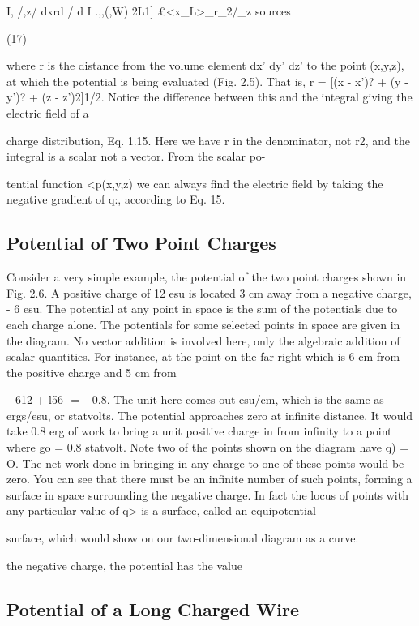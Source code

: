 I, /,z/ dxrd / d I
.,,(,W) 2L1] £<x_L>_r_2/_z
sources

(17)

where r is the distance from the volume element dx' dy' dz' to the
point (x,y,z), at which the potential is being evaluated (Fig. 2.5).
That is, r = [(x - x')? + (y - y')? + (z - z')2]1/2. Notice the
difference between this and the integral giving the electric field of a

charge distribution, Eq. 1.15. Here we have r in the denominator,
not r2, and the integral is a scalar not a vector. From the scalar po-

tential function <p(x,y,z) we can always find the electric field by taking
the negative gradient of q:, according to Eq. 15.

\subsection{Potential of Two Point Charges}

 Consider a very simple example,
the potential of the two point charges shown in Fig. 2.6. A positive
charge of 12 esu is located 3 cm away from a negative charge, - 6 esu.
The potential at any point in space is the sum of the potentials due to
each charge alone. The potentials for some selected points in space
are given in the diagram. No vector addition is involved here, only
the algebraic addition of scalar quantities. For instance, at the point
on the far right which is 6 cm from the positive charge and 5 cm from

+612 + l56- = +0.8.
The unit here comes out esu/cm, which is the same as ergs/esu, or
statvolts. The potential approaches zero at infinite distance. It
would take 0.8 erg of work to bring a unit positive charge in from
infinity to a point where go = 0.8 statvolt. Note two of the points
shown on the diagram have q) = O. The net work done in bringing
in any charge to one of these points would be zero. You can see that
there must be an infinite number of such points, forming a surface in
space surrounding the negative charge. In fact the locus of points
with any particular value of q> is a surface, called an equipotential

surface, which would show on our two-dimensional diagram as a
curve.

the negative charge, the potential has the value

\subsection{Potential of a Long Charged Wire}

